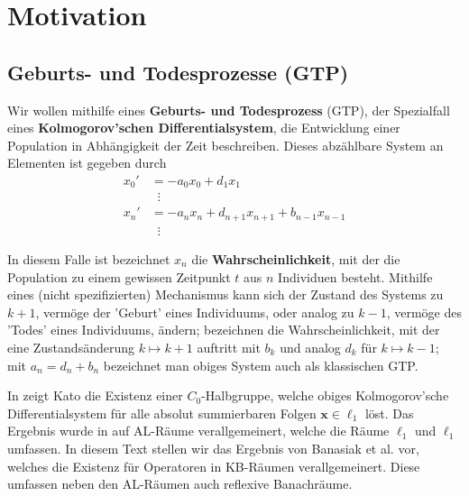 \chapter{Motivation}

\section{Geburts- und Todesprozesse (GTP)}

\par
Wir wollen mithilfe eines \textbf{Geburts- und Todesprozess} (GTP), der Spezialfall eines \textbf{Kolmogorov'schen Differentialsystem}, die Entwicklung einer Population in Abhängigkeit der Zeit beschreiben. Dieses abzählbare System an Elementen ist gegeben durch
\begin{align*}
x_0' &= -a_0x_0 + d_1 x_1\\
&\;\;\vdots\\
x_n' &= -a_nx_n + d_{n+1}x_{n+1} + b_{n-1}x_{n-1}  \\
&\;\;\vdots
\end{align*}

\par 
In diesem Falle ist bezeichnet $x_n$ die \textbf{Wahrscheinlichkeit}, mit der die Population zu einem gewissen Zeitpunkt $t$ aus $n$ Individuen besteht. Mithilfe eines (nicht spezifizierten) Mechanismus kann sich der Zustand des Systems zu $k+1$, vermöge der 'Geburt' eines Individuums, oder analog zu $k-1$, vermöge des 'Todes' eines Individuums, ändern; bezeichnen die Wahrscheinlichkeit, mit der eine Zustandsänderung $k\mapsto k+1$ auftritt mit  $b_k$ und analog $d_k$ für $k\mapsto k-1$; mit $a_n=d_n+b_n$ bezeichnet man obiges System auch als klassischen GTP.

In \cite{kato_1954} zeigt Kato die Existenz einer $C_0$-Halbgruppe, welche obiges Kolmogorov'sche Differentialsystem für alle absolut summierbaren Folgen $\textbf{x}\in \ell_1$ löst. Das Ergebnis wurde  in \cite{} auf AL-Räume verallgemeinert, welche die Räume $\ell_1$ und $\ell_1$ umfassen. In diesem Text stellen wir das Ergebnis von Banasiak et al.  \cite{banasiak_lachowicz_2007} vor, welches die Existenz für Operatoren in KB-Räumen verallgemeinert. Diese umfassen neben den AL-Räumen auch reflexive Banachräume. 





